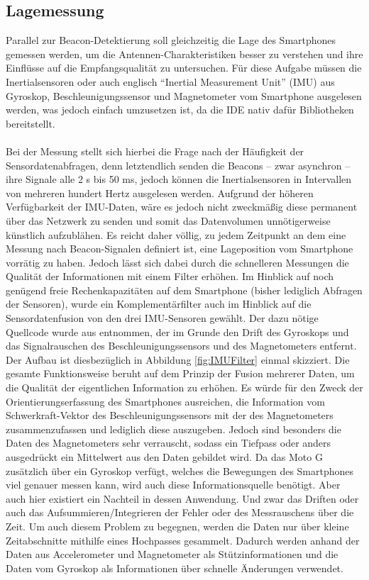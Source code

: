\subsection{Lagemessung}
Parallel zur Beacon-Detektierung soll gleichzeitig die Lage des Smartphones gemessen werden, um die Antennen-Charakteristiken besser zu verstehen und ihre Einflüsse auf die Empfangsqualität zu untersuchen. Für diese Aufgabe müssen die Inertialsensoren oder auch englisch "`Inertial Measurement Unit"' (IMU) aus Gyroskop, Beschleunigungssensor und Magnetometer vom Smartphone ausgelesen werden, was jedoch einfach umzusetzen ist, da die IDE nativ dafür Bibliotheken bereitstellt. \\ \\
Bei der Messung stellt sich hierbei die Frage nach der Häufigkeit der Sensordatenabfragen, denn letztendlich senden die Beacons -- zwar asynchron -- ihre Signale alle 2 s bis 50 ms, jedoch können die Inertialsensoren in Intervallen von mehreren hundert Hertz ausgelesen werden. Aufgrund der höheren Verfügbarkeit der IMU-Daten, wäre es jedoch nicht zweckmäßig diese permanent über das Netzwerk zu senden und somit das Datenvolumen unnötigerweise künstlich aufzublähen. Es reicht daher völlig, zu jedem Zeitpunkt an dem eine Messung nach Beacon-Signalen definiert ist, eine Lageposition vom Smartphone vorrätig zu haben. Jedoch lässt sich dabei durch die schnelleren Messungen die Qualität der Informationen mit einem Filter erhöhen. Im Hinblick auf noch genügend freie Rechenkapazitäten auf dem Smartphone (bisher lediglich Abfragen der Sensoren), wurde ein Komplementärfilter auch im Hinblick auf die Sensordatenfusion von den drei IMU-Sensoren gewählt. Der dazu nötige Quellcode wurde aus \cite{IMUFilter} entnommen, der im Grunde den Drift des Gyroskops und das Signalrauschen des Beschleunigungssensors und des Magnetometers entfernt. Der Aufbau ist diesbezüglich in Abbildung \ref{fig:IMUFilter} einmal skizziert. Die gesamte Funktionsweise beruht auf dem Prinzip der Fusion mehrerer Daten, um die Qualität der eigentlichen Information zu erhöhen. Es würde für den Zweck der Orientierungserfassung des Smartphones ausreichen, die Information vom Schwerkraft-Vektor des Beschleunigungssensors mit der des Magnetometers zusammenzufassen und lediglich diese auszugeben. Jedoch sind besonders die Daten des Magnetometers sehr verrauscht, sodass ein Tiefpass oder anders ausgedrückt ein Mittelwert aus den Daten gebildet wird. Da das Moto G zusätzlich über ein Gyroskop verfügt, welches die Bewegungen des Smartphones viel genauer messen kann, wird auch diese Informationsquelle benötigt. Aber auch hier existiert ein Nachteil in dessen Anwendung. Und zwar das Driften oder auch das Aufsummieren/Integrieren der Fehler oder des Messrauschens über die Zeit. Um auch diesem Problem zu begegnen, werden die Daten nur über kleine Zeitabschnitte mithilfe eines Hochpasses gesammelt. Dadurch werden anhand der Daten aus Accelerometer und Magnetometer als Stützinformationen und die Daten vom Gyroskop als Informationen über schnelle Änderungen verwendet. 
